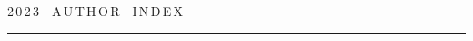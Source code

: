

\def\leftfootline{\small{\textbf{\thepage}


\hfill СИСТЕМЫ И СРЕДСТВА ИНФОРМАТИКИ\ \ \ выпуск~33\ \ \ №~4\ \ \ 2023}


}%


 \def\rightfootline{\small{СИСТЕМЫ И СРЕДСТВА ИНФОРМАТИКИ\ \ \ выпуск~33\ \ \


№~4\ \ \ 2023


 \hfill \textbf{\thepage}}}


 \label{end\stat}





\newpage





\def\stat{cont-e}


{%




\raggedleft\Large \bf%


2\,0\,2\,3\ \ A\,U\,T\,H\,O\,R\ \ I\,N\,D\,E\,X \vskip 17pt


 \hrule


 \par




 }





\label{st\stat}

















\def\leftkol{\ } %


\def\rightkol{\ } %















